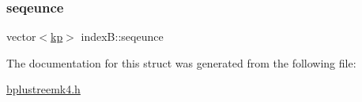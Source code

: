 \subsubsection{\texorpdfstring{seqeunce}{seqeunce}}
{\footnotesize\ttfamily vector$<$\mbox{\hyperlink{structkp}{kp}}$>$ index\+B\+::seqeunce}



The documentation for this struct was generated from the following file\+:\begin{DoxyCompactItemize}
\item 
\mbox{\hyperlink{bplustreemk4_8h}{bplustreemk4.\+h}}\end{DoxyCompactItemize}
